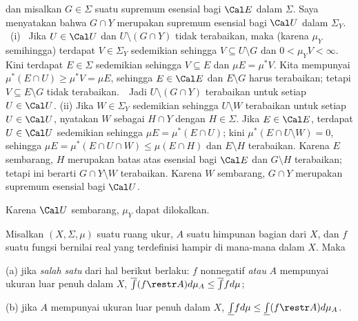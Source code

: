{\noindent dan misalkan $G\in\Sigma$ suatu supremum esensial bagi
$\Cal E$ dalam $\Sigma$.   Saya menyatakan bahwa $G\cap Y$ merupakan
supremum esensial bagi $\Cal U$ dalam $\Sigma_Y$.   \Prf\ (i) \Quer\
Jika $U\in\Cal U$ dan $U\setminus(G\cap Y)$ tidak terabaikan, maka
(karena $\mu_Y$ semihingga) terdapat $V\in\Sigma_Y$ sedemikian sehingga
$V\subseteq U\setminus G$ dan $0<\mu_YV<\infty$.   Kini terdapat
$E\in\Sigma$ sedemikian sehingga $V\subseteq E$ dan $\mu E=\mu^*V$.
Kita mempunyai $\mu^*(E\cap U)\ge\mu^*V=\mu E$, sehingga $E\in\Cal E$
dan $E\setminus G$ harus terabaikan; tetapi
$V\subseteq E\setminus G$ tidak terabaikan.\ \BanG\   Jadi
$U\setminus(G\cap Y)$ terabaikan untuk setiap $U\in\Cal U$.
(ii) Jika $W\in\Sigma_Y$ sedemikian sehingga $U\setminus W$ terabaikan
untuk setiap $U\in\Cal U$, nyatakan $W$ sebagai $H\cap Y$ dengan
$H\in\Sigma$.   Jika $E\in\Cal E$, terdapat $U\in\Cal U$ sedemikian
sehingga $\mu E=\mu^*(E\cap U)$; kini $\mu^*(E\cap U\setminus W)=0$,
sehingga $\mu E=\mu^*(E\cap U\cap W)\le\mu(E\cap H)$ dan
$E\setminus H$ terabaikan.   Karena $E$ sembarang, $H$ merupakan batas
atas esensial bagi $\Cal E$ dan $G\setminus H$ terabaikan; tetapi ini
berarti $G\cap Y\setminus W$ terabaikan.   Karena $W$ sembarang,
$G\cap Y$ merupakan supremum esensial bagi $\Cal U$.\ \Qed

Karena $\Cal U$ sembarang, $\mu_Y$ dapat dilokalkan.
}%

 Misalkan $(X,\Sigma,\mu)$ suatu ruang ukur,
$A$ suatu himpunan bagian dari $X$, dan $f$ suatu fungsi bernilai real
yang terdefinisi hampir di mana-mana dalam $X$.   Maka

(a) jika {\it salah satu} dari hal berikut berlaku: $f$ nonnegatif
{\it atau} $A$ mempunyai ukuran luar penuh dalam $X$,
$\overline{\intop}(f\restr A)d\mu_A\le\overline{\intop}fd\mu$;

(b) jika $A$ mempunyai ukuran luar penuh dalam $X$,
$\underline{\int}fd\mu\le\underline{\int}(f\restr A)d\mu_A$.

